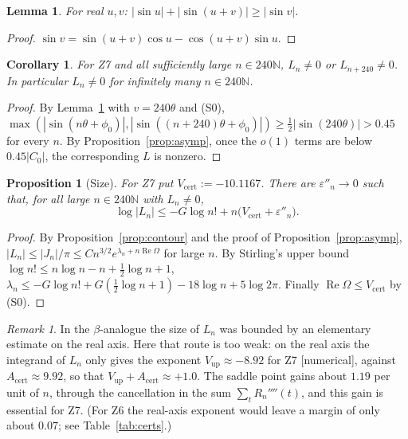 \documentclass[11pt]{amsart}
\newtheorem{proposition}[theorem]{Proposition}
\newtheorem{lemma}[theorem]{Lemma}
\newtheorem{corollary}[theorem]{Corollary}
\theoremstyle{definition}
\theoremstyle{remark}
\newtheorem{remark}[theorem]{Remark}
\numberwithin{equation}{section}
\newcommand{\NN}{\mathbb{N}}
\newcommand{\Acert}{A_{\mathrm{cert}}}
\newcommand{\Vcert}{V_{\mathrm{cert}}}
\renewcommand{\Re}{\operatorname{Re}}
\newcommand{\eps}{\varepsilon}
\begin{document}
\begin{lemma}\label{lem:sines}
For real $u,v$: $|\sin u|+|\sin(u+v)|\ge|\sin v|$.
\end{lemma}

\begin{proof}
$\sin v=\sin(u+v)\cos u-\cos(u+v)\sin u$.
\end{proof}

\begin{corollary}\label{cor:nonvan}
For Z7 and all sufficiently large $n\in240\NN$, $L_n\ne0$ or $L_{n+240}\ne0$. In particular $L_n\ne0$ for
infinitely many $n\in240\NN$.
\end{corollary}

\begin{proof}
By Lemma~\ref{lem:sines} with $v=240\theta$ and (S0),
$\max(|\sin(n\theta+\phi_0)|,|\sin((n+240)\theta+\phi_0)|)\ge\frac12|\sin(240\theta)|>0.45$ for every $n$. By
Proposition~\ref{prop:asymp}, once the $o(1)$ terms are below $0.45|C_0|$, the corresponding $L$ is nonzero.
\end{proof}

\begin{proposition}[Size]\label{prop:size}
For Z7 put $\Vcert:=-10.1167$. There are $\eps''_n\to0$ such that, for all large $n\in240\NN$ with $L_n\ne0$,
\[
  \log|L_n|\le-G\log n!+n\bigl(\Vcert+\eps''_n\bigr).
\]
\end{proposition}

\begin{proof}
By Proposition~\ref{prop:contour} and the proof of Proposition~\ref{prop:asymp},
$|L_n|\le|J_n|/\pi\le Cn^{3/2}e^{\lambda_n+n\Re\Omega}$ for large $n$. By Stirling's upper bound
$\log n!\le n\log n-n+\frac12\log n+1$,
$\lambda_n\le-G\log n!+G(\frac12\log n+1)-18\log n+5\log2\pi$. Finally $\Re\Omega\le\Vcert$ by (S0).
\end{proof}

\begin{remark}\label{rem:realaxis}
In the $\beta$-analogue \cite{BetaPaper} the size of $L_n$ was bounded by an elementary estimate on the real axis.
Here that route is too weak: on the real axis the integrand of $L_n$ only gives the exponent
$V_{\mathrm{up}}\approx-8.92$ for Z7 [numerical], against $\Acert\approx9.92$, so that $V_{\mathrm{up}}+\Acert\approx+1.0$.
The saddle point gains about $1.19$ per unit of $n$, through the cancellation in the sum $\sum_tR_n''''(t)$, and this
gain is essential for Z7. (For Z6 the real-axis exponent would leave a margin of only about $0.07$; see
Table~\ref{tab:certs}.)
\end{remark}
\end{document}
